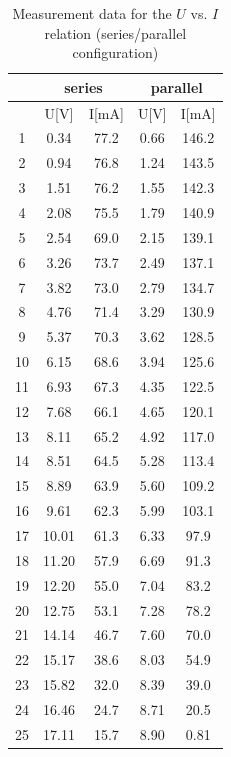 \documentclass[12pt]{article}
\begin{document}
\begin{table}[H]
\centering
\begin{tabular}{|c|c|c|c|c|}
\hline
   & \multicolumn{2}{c|}{series}      & \multicolumn{2}{c|}{parallel}      \\ \hline
   & U[V] & I[mA] & U[V] & I[mA]  \\ \hline
1  & 0.34     & 77.2           & 0.66     & 146.2         \\ \hline
2  & 0.94     & 76.8          & 1.24     & 143.5           \\ \hline
3  & 1.51     & 76.2            & 1.55     & 142.3          \\ \hline
4  & 2.08     & 75.5            & 1.79     & 140.9           \\ \hline
5  & 2.54     & 69.0           & 2.15     & 139.1         \\ \hline
6  & 3.26     & 73.7            & 2.49     & 137.1           \\ \hline
7  & 3.82     & 73.0            & 2.79     & 134.7           \\ \hline
8  & 4.76     & 71.4            & 3.29     & 130.9           \\ \hline
9  & 5.37     & 70.3            & 3.62     & 128.5         \\ \hline
10 & 6.15     & 68.6            & 3.94     & 125.6          \\ \hline
11 & 6.93     & 67.3           & 4.35     & 122.5           \\ \hline
12 & 7.68     & 66.1            & 4.65     & 120.1         \\ \hline
13 & 8.11     & 65.2            & 4.92     & 117.0          \\ \hline
14 & 8.51     & 64.5            & 5.28     & 113.4           \\ \hline
15 & 8.89     & 63.9            & 5.60     & 109.2         \\ \hline
16 & 9.61     & 62.3            & 5.99     & 103.1          \\ \hline
17 & 10.01    & 61.3            & 6.33     & 97.9          \\ \hline
18 & 11.20    & 57.9            & 6.69     & 91.3           \\ \hline
19 & 12.20    & 55.0            & 7.04     & 83.2           \\ \hline
20 & 12.75    & 53.1            & 7.28     & 78.2           \\ \hline
21 & 14.14    & 46.7            & 7.60     & 70.0           \\ \hline
22 & 15.17    & 38.6            & 8.03     & 54.9          \\ \hline
23 & 15.82    & 32.0            & 8.39     & 39.0            \\ \hline
24 & 16.46    & 24.7            & 8.71     & 20.5            \\ \hline
25 & 17.11    & 15.7            & 8.90     & 0.81         \\ \hline
\end{tabular}
\caption{Measurement data for the $U$ vs. $I$ relation (series/parallel configuration)}
\end{table}
\end{document}
